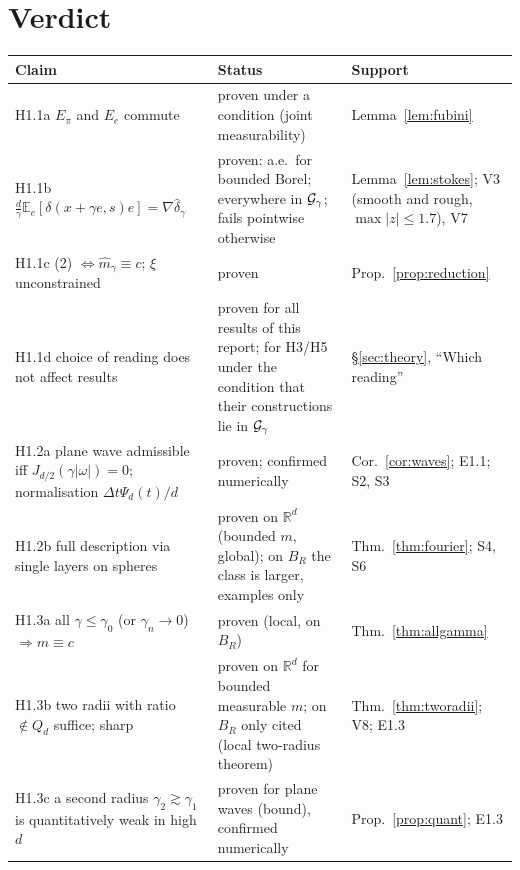 \documentclass[11pt,a4paper]{article}
\numberwithin{equation}{section}
\theoremstyle{definition}
\theoremstyle{remark}
\newcommand{\E}{\mathbb E}\newcommand{\R}{\mathbb R}\newcommand{\N}{\mathbb N}\newcommand{\Prob}{\mathbb P}
\begin{document}
\section{Verdict}\label{sec:verdict}
\begin{center}\small
\begin{tabularx}{\textwidth}{@{}p{5.2cm}p{3.0cm}X@{}}
\toprule
\textbf{Claim} & \textbf{Status} & \textbf{Support}\\\midrule
H1.1a $E_\pi$ and $E_e$ commute & proven under a condition (joint measurability) & Lemma~\ref{lem:fubini} \\
H1.1b $\frac d\gamma\E_e[\delta(x+\gamma e,s)e]=\nabla\hat\delta_\gamma$ & proven: a.e.\ for bounded Borel; everywhere in $\mathcal G_\gamma$; fails pointwise otherwise & Lemma~\ref{lem:stokes}; V3 (smooth and rough, $\max|z|\le1.7$), V7 \\
H1.1c (2) $\iff\hat m_\gamma\equiv c$; $\xi$ unconstrained & proven & Prop.~\ref{prop:reduction} \\
H1.1d choice of reading does not affect results & proven for all results of this report; for H3/H5 under the condition that their constructions lie in $\mathcal G_\gamma$ & \S\ref{sec:theory}, ``Which reading'' \\
H1.2a plane wave admissible iff $J_{d/2}(\gamma|\omega|)=0$; normalisation $\Delta t\Psi_d(t)/d$ & proven; confirmed numerically & Cor.~\ref{cor:waves}; E1.1; S2, S3 \\
H1.2b full description via single layers on spheres & proven on $\R^d$ (bounded $m$, global); on $B_R$ the class is larger, examples only & Thm.~\ref{thm:fourier}; S4, S6 \\
H1.3a all $\gamma\le\gamma_0$ (or $\gamma_n\to0$) $\Rightarrow m\equiv c$ & proven (local, on $B_R$) & Thm.~\ref{thm:allgamma} \\
H1.3b two radii with ratio $\notin Q_d$ suffice; sharp & proven on $\R^d$ for bounded measurable $m$; on $B_R$ only cited (local two-radius theorem) & Thm.~\ref{thm:tworadii}; V8; E1.3 \\
H1.3c a second radius $\gamma_2\gtrsim\gamma_1$ is quantitatively weak in high $d$ & proven for plane waves (bound), confirmed numerically & Prop.~\ref{prop:quant}; E1.3 \\
\bottomrule
\end{tabularx}
\end{center}
\end{document}
